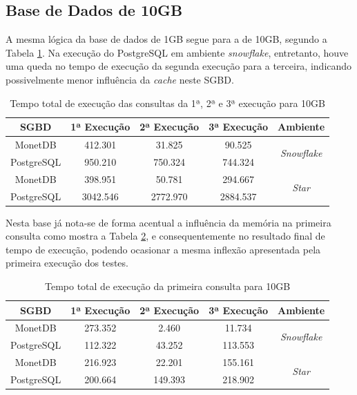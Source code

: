 \subsection{Base de Dados de 10GB}

A mesma lógica da base de dados de 1GB segue para a de 10GB, segundo a Tabela \ref{tab:queries_cache_10}. Na execução do PostgreSQL em ambiente \textit{snowflake}, entretanto, houve uma queda no tempo de execução da segunda execução para a terceira, indicando possivelmente menor influência da \textit{cache} neste SGBD.


\begin{table}[htpb]
        \centering
        \caption{Tempo total de execução das consultas da 1ª, 2ª e 3ª execução para 10GB}
        \label{tab:queries_cache_10}
        \begin{tabular}{|c|c|c|c|c|}
        \hline
        SGBD       & 1ª Execução & 2ª Execução & 3ª Execução & Ambiente                            \\ \hline
        MonetDB    & 412.301     & 31.825      & 90.525      & \multirow{2}{*}{\textit{Snowflake}} \\ \cline{1-4}
        PostgreSQL & 950.210     & 750.324     & 744.324     &                                     \\ \hline
        MonetDB    & 398.951     & 50.781      & 294.667     & \multirow{2}{*}{\textit{Star}}      \\ \cline{1-4}
        PostgreSQL & 3042.546    & 2772.970    & 2884.537    &                                     \\ \hline
        \end{tabular}
\end{table}

Nesta base já nota-se de forma acentual a influência da memória na primeira consulta como mostra a Tabela \ref{tab:q1_cache_10}, e consequentemente no resultado final de tempo de execução, podendo ocasionar a mesma inflexão apresentada pela primeira execução dos testes.

\begin{table}[htpb]
        \centering
        \caption{Tempo total de execução da primeira consulta para 10GB}
        \label{tab:q1_cache_10}
        \begin{tabular}{|c|c|c|c|c|}
        \hline
        SGBD       & 1ª Execução & 2ª Execução & 3ª Execução & Ambiente                            \\ \hline
        MonetDB    & 273.352     & 2.460       & 11.734      & \multirow{2}{*}{\textit{Snowflake}} \\ \cline{1-4}
        PostgreSQL & 112.322     & 43.252      & 113.553     &                                     \\ \hline
        MonetDB    & 216.923     & 22.201      & 155.161     & \multirow{2}{*}{\textit{Star}}      \\ \cline{1-4}
        PostgreSQL & 200.664     & 149.393     & 218.902     &                                     \\ \hline
        \end{tabular}
\end{table}

